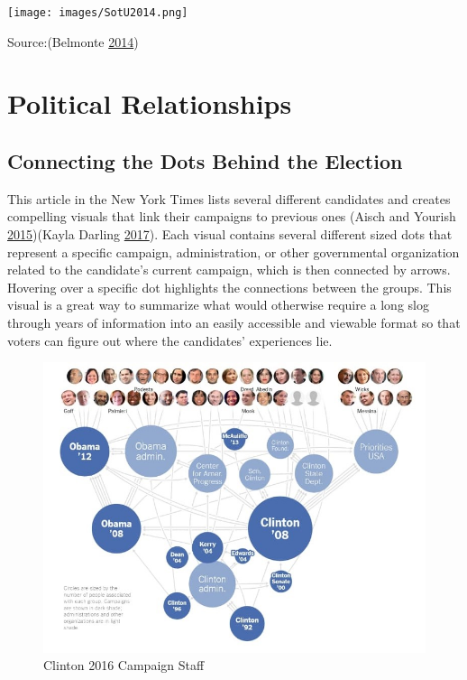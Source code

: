 \documentclass[]{book}
\begin{document}
\texttt{[image: images/SotU2014.png]}

Source:(Belmonte \protect\hyperlink{ref-SotU2014}{2014})

\hypertarget{political-relationships}{%
\section{Political Relationships}\label{political-relationships}}

\hypertarget{connecting-the-dots-behind-the-election}{%
\subsection{Connecting the Dots Behind the Election}\label{connecting-the-dots-behind-the-election}}

This article in the New York Times lists several different candidates and creates compelling visuals that link their campaigns to previous ones (Aisch and Yourish \protect\hyperlink{ref-campaign_staff}{2015})(Kayla Darling \protect\hyperlink{ref-cool_data}{2017}). Each visual contains several different sized dots that represent a specific campaign, administration, or other governmental organization related to the candidate's current campaign, which is then connected by arrows. Hovering over a specific dot highlights the connections between the groups. This visual is a great way to summarize what would otherwise require a long slog through years of information into an easily accessible and viewable format so that voters can figure out where the candidates' experiences lie.

\begin{figure}
\centering
\includegraphics{images/NewClinton.png}
\caption{Clinton 2016 Campaign Staff}
\end{figure}
\end{document}
